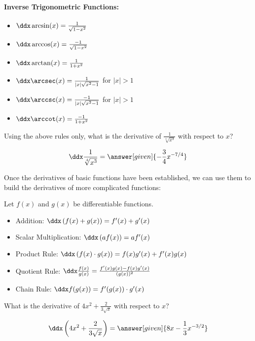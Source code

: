 \documentclass[nooutcomes]{ximera}
\begin{document}
\paragraph{Inverse Trigonometric Functions:}
\begin{itemize}
\item $\ddx \arcsin(x) = \frac{1}{\sqrt{1-x^2}}$
\item $\ddx \arccos(x) = \frac{-1}{\sqrt{1-x^2}}$
\item $\ddx \arctan(x) =\frac{1}{1+x^2}$
\item $\ddx \arcsec(x) = \frac{1}{|x|\sqrt{x^2-1}}$ for $|x|>1$
\item $\ddx \arccsc(x) = \frac{-1}{|x|\sqrt{x^2-1}}$ for $|x|>1$
\item $\ddx \arccot(x) = \frac{-1}{1+x^2}$
\end{itemize}



\begin{question} 
  Using the above rules only, what is the derivative of $\frac{1}{\sqrt[4]{x^3}}$ with respect to $x$?
  \begin{prompt} 
    \[
    \ddx \frac{1}{\sqrt[4]{x^3}} = \answer[given]{- \frac{3}{4} x^{-7/4}}
    \]
  \end{prompt}
\end{question}


Once the derivatives of basic functions have been established, we can use them to build the derivatives of more complicated functions:


\begin{theorem}
  Let $f(x)$ and $g(x)$ be differentiable functions.
\begin{itemize}
\item Addition: $\ddx \left( f(x) + g(x) \right) = f'(x) + g'(x)$
\item Scalar Multiplication: $\ddx \left( af(x) \right) = a f'(x)$
\item Product Rule: $\ddx \left( f(x) \cdot g(x) \right) = f(x)g'(x) + f'(x)g(x)$
\item Quotient Rule: $\ddx \frac{f(x)}{g(x)} = \frac{f'(x)g(x) - f(x)g'(x)}{(g(x))^2}$
\item Chain Rule: $\ddx f(g(x)) = f'(g(x)) \cdot g'(x)$
\end{itemize}
\end{theorem}

\begin{question} 
  What is the derivative of $4x^2 +\frac{2}{3\sqrt{x}} $ with respect to $x$?
  \begin{prompt} 
    \[
    \ddx \left(4x^2 +\frac{2}{3\sqrt{x}} \right) = \answer[given]{8x -\frac{1}{3} x^{-3/2}}
    \]
  \end{prompt}
\end{question}
\end{document}
